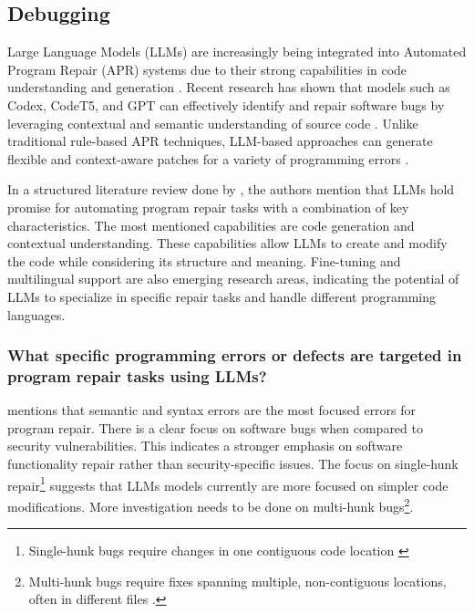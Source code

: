 \subsection{Debugging}
Large Language Models (LLMs) are increasingly being integrated into Automated Program Repair (APR) systems due to their strong capabilities in code understanding and generation \cite{llm_repair_1}. Recent research has shown that models such as Codex, CodeT5, and GPT can effectively identify and repair software bugs by leveraging contextual and semantic understanding of source code \cite{llm_repair_3,llm_repair_4}. Unlike traditional rule-based APR techniques, LLM-based approaches can generate flexible and context-aware patches for a variety of programming errors \cite{llm_repair_6}.

In a structured literature review done by \citet{zubair2025llmprogramrepair}, the authors mention that LLMs hold promise for automating program repair tasks with a combination of key characteristics. The most mentioned capabilities are code generation and contextual understanding. These capabilities allow LLMs to create and modify the code while considering its structure and meaning. Fine-tuning and multilingual support are also emerging research areas, indicating the potential of LLMs to specialize in specific repair tasks and handle different programming languages.

\subsubsection{What specific programming errors or defects are targeted in program repair tasks using LLMs?}
\citet{zubair2025llmprogramrepair} mentions that semantic and syntax errors are the most focused errors for program repair. There is a clear focus on software bugs when compared to security vulnerabilities. This indicates a stronger emphasis on software functionality repair rather than security-specific issues. The focus on single-hunk repair\footnote{Single-hunk bugs require changes in one contiguous code location \cite{zubair2025llmprogramrepair}} suggests that LLMs models currently are more focused on simpler code modifications. More investigation needs to be done on multi-hunk bugs\footnote{Multi-hunk bugs require fixes spanning multiple, non-contiguous locations, often in different files \cite{zubair2025llmprogramrepair}.}.

